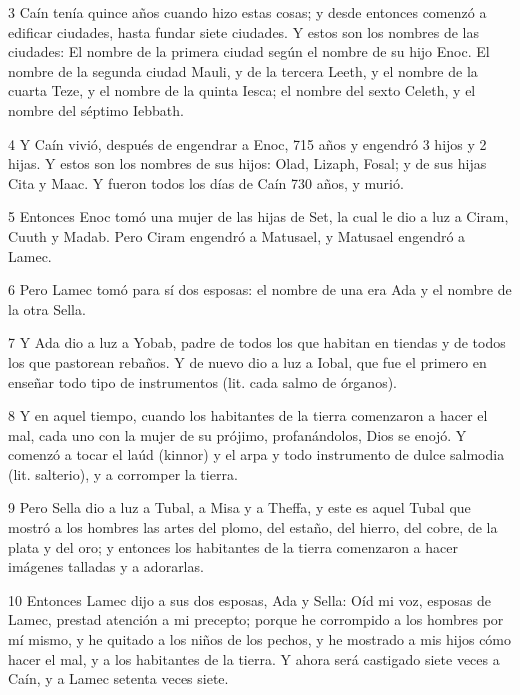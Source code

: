 \par 3 Caín tenía quince años cuando hizo estas cosas; y desde entonces comenzó a edificar ciudades, hasta fundar siete ciudades. Y estos son los nombres de las ciudades: El nombre de la primera ciudad según el nombre de su hijo Enoc. El nombre de la segunda ciudad Mauli, y de la tercera Leeth, y el nombre de la cuarta Teze, y el nombre de la quinta Iesca; el nombre del sexto Celeth, y el nombre del séptimo Iebbath.

\par 4 Y Caín vivió, después de engendrar a Enoc, 715 años y engendró 3 hijos y 2 hijas. Y estos son los nombres de sus hijos: Olad, Lizaph, Fosal; y de sus hijas Cita y Maac. Y fueron todos los días de Caín 730 años, y murió.

\par 5 Entonces Enoc tomó una mujer de las hijas de Set, la cual le dio a luz a Ciram, Cuuth y Madab. Pero Ciram engendró a Matusael, y Matusael engendró a Lamec.

\par 6 Pero Lamec tomó para sí dos esposas: el nombre de una era Ada y el nombre de la otra Sella.

\par 7 Y Ada dio a luz a Yobab, padre de todos los que habitan en tiendas y de todos los que pastorean rebaños. Y de nuevo dio a luz a Iobal, que fue el primero en enseñar todo tipo de instrumentos (lit. cada salmo de órganos).

\par 8 Y en aquel tiempo, cuando los habitantes de la tierra comenzaron a hacer el mal, cada uno con la mujer de su prójimo, profanándolos, Dios se enojó. Y comenzó a tocar el laúd (kinnor) y el arpa y todo instrumento de dulce salmodia (lit. salterio), y a corromper la tierra.

\par 9 Pero Sella dio a luz a Tubal, a Misa y a Theffa, y este es aquel Tubal que mostró a los hombres las artes del plomo, del estaño, del hierro, del cobre, de la plata y del oro; y entonces los habitantes de la tierra comenzaron a hacer imágenes talladas y a adorarlas.

\par 10 Entonces Lamec dijo a sus dos esposas, Ada y Sella: Oíd mi voz, esposas de Lamec, prestad atención a mi precepto; porque he corrompido a los hombres por mí mismo, y he quitado a los niños de los pechos, y he mostrado a mis hijos cómo hacer el mal, y a los habitantes de la tierra. Y ahora será castigado siete veces a Caín, y a Lamec setenta veces siete.

